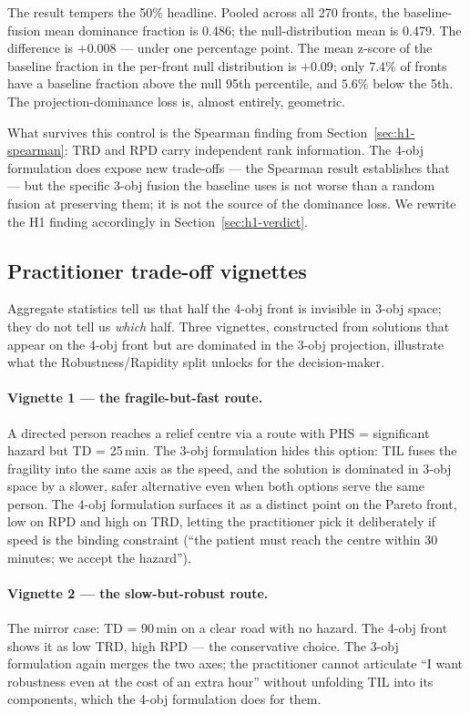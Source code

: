 \documentclass[applsci,article,submit,moreauthors,pdftex]{Definitions/mdpi}
\begin{document}
The result tempers the 50\% headline. Pooled across all 270 fronts, the
baseline-fusion mean dominance fraction is 0.486; the null-distribution
mean is 0.479. The difference is $+0.008$ --- under one percentage point.
The mean z-score of the baseline fraction in the per-front null distribution
is $+0.09$; only $7.4\%$ of fronts have a baseline fraction above the
null 95th percentile, and $5.6\%$ below the 5th. The projection-dominance
loss is, almost entirely, geometric.

What survives this control is the Spearman finding from
Section~\ref{sec:h1-spearman}: TRD and RPD carry independent rank
information. The 4-obj formulation does expose new trade-offs --- the
Spearman result establishes that --- but the specific 3-obj fusion the
baseline uses is not worse than a random fusion at preserving them; it is
not the source of the dominance loss. We rewrite the H1 finding
accordingly in Section~\ref{sec:h1-verdict}.

\subsection{Practitioner trade-off vignettes}\label{sec:h1-vignettes}

Aggregate statistics tell us that half the 4-obj front is invisible in
3-obj space; they do not tell us \emph{which} half. Three vignettes,
constructed from solutions that appear on the 4-obj front but are
dominated in the 3-obj projection, illustrate what the Robustness/Rapidity
split unlocks for the decision-maker.

\paragraph{Vignette 1 --- the fragile-but-fast route.}
A directed person reaches a relief centre via a route with PHS = significant
hazard but TD = 25\,min. The 3-obj formulation hides this option: TIL fuses
the fragility into the same axis as the speed, and the solution is
dominated in 3-obj space by a slower, safer alternative even when both
options serve the same person. The 4-obj formulation surfaces it as a
distinct point on the Pareto front, low on RPD and high on TRD, letting the
practitioner pick it deliberately if speed is the binding constraint
(``the patient must reach the centre within 30 minutes; we accept the
hazard'').

\paragraph{Vignette 2 --- the slow-but-robust route.}
The mirror case: TD = 90\,min on a clear road with no hazard. The 4-obj
front shows it as low TRD, high RPD --- the conservative choice. The 3-obj
formulation again merges the two axes; the practitioner cannot articulate
``I want robustness even at the cost of an extra hour'' without
unfolding TIL into its components, which the 4-obj formulation does for
them.
\end{document}
